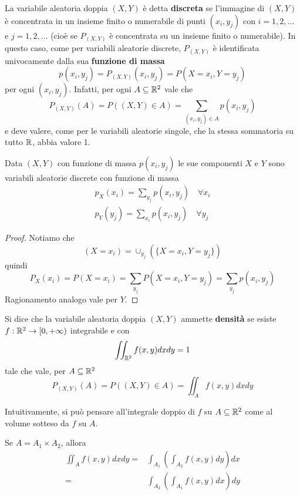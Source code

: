 \begin{definition}
	La variabile aleatoria doppia $(X,Y)$ è detta \textbf{discreta} se l'immagine di $(X,Y)$ è
	concentrata in un insieme finito o numerabile di punti $(x_i, y_j)$ con $i = 1,2,\dots$ e
	$j = 1,2,\dots$ (cioè se $P_{(X,Y)}$ è concentrata su un insieme finito o numerabile). In
	questo caso, come per variabili aleatorie discrete, $P_{(X,Y)}$ è identificata univocamente
	dalla sua \textbf{funzione di massa}
	\[ p(x_i, y_j) = P_{(X,Y)} (x_i, y_j) = P(X = x_i, Y = y_j) \]
	per ogni $(x_i, y_j)$. Infatti, per ogni $A \subseteq \mathbb{R}^2$ vale che
	\[ P_{(X,Y)} (A) = P((X,Y) \in A) = \sum_{(x_i, y_j) \in A} p(x_i, y_j) \]
	e deve valere, come per le variabili aleatorie singole, che la stessa sommatoria su tutto $\mathbb{R}$,
	abbia valore 1.
\end{definition}

\begin{proposition}
	Data $(X, Y)$ con funzione di massa $p(x_i, y_j)$ le sue componenti $X$ e $Y$ sono variabili
	aleatorie discrete con funzione di massa
	\begin{gather*}
		p_X(x_i) = \sum_{y_j} p (x_i, y_j) \quad \forall x_i \\
		p_Y(y_j) = \sum_{x_i} p (x_i, y_j) \quad \forall y_j
	\end{gather*}
	\begin{proof}
		Notiamo che
		\[ (X = x_i) = \cup_{y_j} (\{ X = x_i, Y = y_j \}) \]
		quindi
		\[ P_X(x_i) = P(X = x_i) = \sum_{y_j} P(X = x_i, Y = y_j) = \sum_{y_j} p(x_i, y_j) \]
		Ragionamento analogo vale per $Y$.
	\end{proof}
\end{proposition}

\begin{definition}
	Si dice che la variabile aleatoria doppia $(X,Y)$ ammette \textbf{densità} se esiste
	$f : \mathbb{R}^2 \to [0, +\infty)$ integrabile e con
	\[ \iint_{\mathbb{R}^2} f(x,y) dx dy = 1 \]
	tale che vale, per $A \subseteq \mathbb{R}^2$
	\[ P_{(X,Y)} (A) = P((X,Y) \in A) = \iint_A f(x,y) dx dy \]
\end{definition}

Intuitivamente, si può pensare all'integrale doppio di $f$ su $A \subseteq \mathbb{R}^2$ come al volume
sotteso da $f$ su $A$.

\begin{theorem}
	Se $A = A_1 \times A_2$, allora
	\begin{align*}
		\iint_A f(x,y) dx dy = & \int_{A_1} \left( \int_{A_2} f(x,y) dy \right) dx \\
		=                      & \int_{A_2} \left( \int_{A_1} f(x,y) dx \right) dy
	\end{align*}
\end{theorem}

